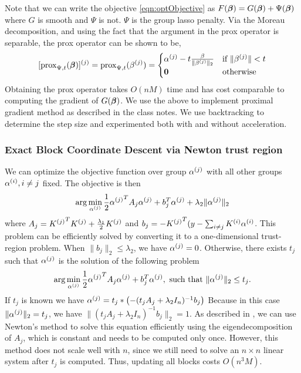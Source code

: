Note that we can write the objective \eqref{eqn:optObjective} as $F({\bm{\beta}}) =
G({\bm{\beta}}) + \Psi({\bm{\beta}})$ where $G$ is smooth and $\Psi$ is not. $\Psi$ is the
group lasso penalty. Via the Moreau decomposition, and using the fact
that the argument in the prox operator is separable, the prox operator can
be shown to be,
\[
[{\bf{\rm prox}}_{\Psi, t} ({\bm{\beta}})]^{(j)} =
{\bf{\rm prox}}_{\Psi, t} ({\beta^{(j)}}) = 
  \begin{cases}
    {\alpha^{(j)}} - t \frac{\beta}{\|{\beta^{(j)}}\|_2} & \text{if } 
              \|{\beta^{(j)}}\| < t \\
    {\bf 0} & \text{otherwise}
  \end{cases}
\]
Obtaining the prox operator takes $O(nM)$ time and has cost comparable to
computing the gradient of $G({\bm{\beta}})$. We use the above to implement proximal
gradient method as described in the class notes. We use backtracking to
determine the step size and experimented both with and without acceleration.

\subsubsection*{Exact Block Coordinate Descent via Newton trust region}

We can optimize the objective function over group ${\alpha^{(j)}}$ with all other groups
${\alpha^{(i)}}, i \ne j$ fixed. The objective is then
\[
\arg\min_{\alpha^{(j)}} \frac{1}{2}{\alpha^{(j)}}^T A_j {\alpha^{(j)}} + b_j^T {\alpha^{(j)}} + \lambda_2 \|{\alpha^{(j)}}\|_2
\]
where $A_j = {K^{(j)}}^T {K^{(j)}} + \frac{\lambda_1}{2}{K^{(j)}}$ 
and $b_j = -{K^{(j)}}^T (y-\sum_{i\ne j}{{K^{(i)}} {\alpha^{(i)}}}$.
This problem can be efficiently solved \citep{bcd-group-lasso:2013} 
by converting it to a one-dimensional trust-region problem. 
When $\|b_j\|_2 \le \lambda_2$, we have ${\alpha^{(j)}} = 0$. 
Otherwise, there exists $t_j$ such that ${\alpha^{(j)}}$ is the solution of
the following problem
\[
\arg\min_{\alpha^{(j)}} \frac{1}{2}{\alpha^{(j)}}^T A_j {\alpha^{(j)}} + b_j^T {\alpha^{(j)}}, 
\text{ such that } \|{\alpha^{(j)}}\|_2 \le t_j.
\]
If $t_j$ is known we have ${\alpha^{(j)}} = t_j * \left(-(t_j A_j + \lambda_2 I_n)^{-1} b_j\right)$
Because in this case $\|{\alpha^{(j)}}\|_2 = t_j$, we have $\|(t_j A_j + \lambda_2 I_n)^{-1} b_j\|_2 = 1$.
As described in \citet{bcd-group-lasso:2013}, 
we can use Newton's method to solve this equation efficiently 
using the eigendecomposition of $A_j$, which is constant and needs to be computed only once.
However, this method does not scale well with $n$, since we still need
to solve an $n \times n$ linear system after $t_j$ is computed.
Thus, updating all blocks costs $O(n^3 M)$.

